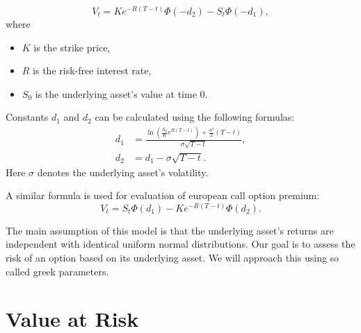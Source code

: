 \documentclass[a4paper, 12pt]{article}
\theoremstyle{definition}
\theoremstyle{plain}
\theoremstyle{definition}
\begin{document}
\begin{equation}\label{put}
    V_t = Ke^{-R(T-t)}\Phi(-d_2)-S_t\Phi(-d_1),
\end{equation}
where 
\begin{itemize}
    \item $K$ is the strike price,
    \item $R$ is the risk-free interest rate,
    \item $S_0$ is the underlying asset's value at time $0$.
\end{itemize}
Constants $d_1$ and $d_2$ can be calculated using the following formulas:
\begin{equation}
    \begin{aligned}
        d_1 &= \frac{\ln(\frac{S_0}{K}e^{R(T-t)})+\frac{\sigma^2}{2}(T-t)}{\sigma\sqrt{T-t}},\\
    d_2 &= d_1-\sigma\sqrt{T-t}. 
    \end{aligned}
\end{equation}
Here $\sigma$ denotes the underlying asset's volatility.

A similar formula is used for evaluation of european call option premium:
\begin{equation}\label{call}
    V_t = S_t\Phi(d_1) - Ke^{-R(T-t)}\Phi(d_2).
\end{equation}

The main assumption of this model is that the underlying asset's returns are 
independent with identical uniform normal distributions.
Our goal is to assess the risk of an option based on its underlying asset.
We will approach this using so called greek parameters.




\section{Value at Risk}
\end{document}
